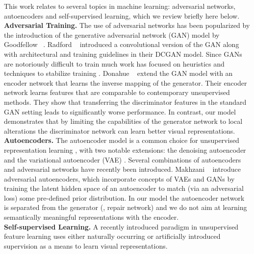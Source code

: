 \documentclass[10pt,twocolumn,letterpaper]{article}
\begin{document}
This work relates to several topics in machine learning: adversarial networks, autoencoders and self-supervised learning, which we review briefly here below.\\
\textbf{Adversarial Training.}
The use of adversarial networks has been popularized by the introduction of the generative adversarial network (GAN) model by Goodfellow \etal~\cite{goodfellow2014generative}.
Radford \etal~\cite{radford2015unsupervised} introduced a convolutional version of the GAN along with architectural and training guidelines in their DCGAN model. 
Since GANs are notoriously difficult to train much work has focused on heuristics and techniques to stabilize training \cite{salimans2016improved,radford2015unsupervised}.
Donahue \etal~\cite{donahue2016adversarial} extend the GAN model with an encoder network that learns the inverse mapping of the generator. Their encoder network learns features that are comparable to contemporary unsupervised methods. They show that transferring the discriminator features in the standard GAN setting leads to significantly worse performance. In contrast, our model demonstrates that by limiting the capabilities of the generator network to local alterations the discriminator network can learn better visual representations. \\
\textbf{Autoencoders.}
The autoencoder model is a common choice for unsupervised representation learning  \cite{hinton1994autoencoders}, with two notable extensions: the denoising autoencoder \cite{vincent2010stacked} and the variational autoencoder (VAE) \cite{kingma2013auto}.
Several combinations of autoencoders and adversarial networks have recently been introduced. Makhzani \etal~\cite{makhzani2015adversarial} introduce adversarial autoencoders,
which incorporate concepts of VAEs and GANs by training the latent hidden space of an autoencoder to match (via an adversarial loss) some pre-defined prior distribution. 
In our model the autoencoder network is separated from the generator (\ie, repair network) and we do not aim at learning semantically meaningful representations with the encoder. \\
\textbf{Self-supervised Learning.}
A recently introduced paradigm in unsupervised feature learning uses either naturally occurring or artificially introduced supervision as a means to learn visual representations.
\end{document}
